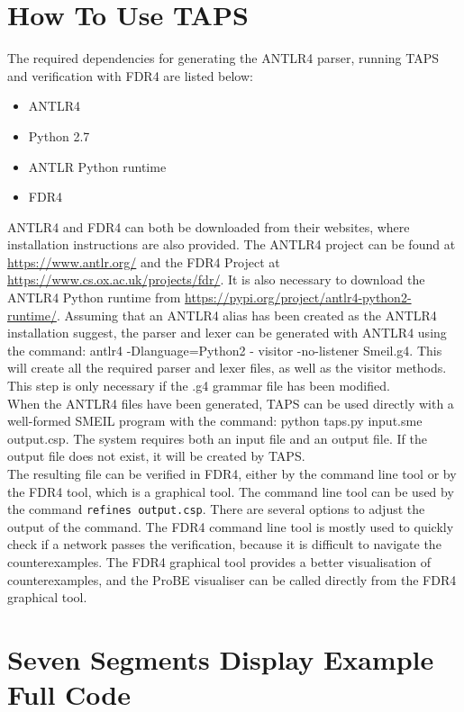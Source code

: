 \chapter{How To Use TAPS}
The required dependencies for generating the ANTLR4 parser, running TAPS and verification with FDR4 are listed below:
\begin{itemize}
    \item ANTLR4
    \item Python 2.7
    \item ANTLR Python runtime
    \item FDR4
\end{itemize}

ANTLR4 and FDR4 can both be downloaded from their websites, where installation instructions are also provided.
The ANTLR4 project can be found at \url{https://www.antlr.org/} and the FDR4 Project at \url{https://www.cs.ox.ac.uk/projects/fdr/}.
It is also necessary to download the ANTLR4 Python runtime from \url{https://pypi.org/project/antlr4-python2-runtime/}.
Assuming that an ANTLR4 alias has been created as the ANTLR4 installation suggest, the parser and lexer can be generated with ANTLR4 using the command: {\ttfamily antlr4 -Dlanguage=Python2 - visitor -no-listener Smeil.g4.}
This will create all the required parser and lexer files, as well as the visitor methods. This step is only necessary if the .g4 grammar file has been modified.\\

When the ANTLR4 files have been generated, TAPS can be used directly with a well-formed SMEIL program with the command: {\ttfamily python taps.py input.sme output.csp}. The system requires both an input file and an output file. If the output file does not exist, it will be created by TAPS. \\

The resulting \cspm{} file can be verified in FDR4, either by the command line tool or by the FDR4 tool, which is a graphical tool. The command line tool can be used by the command \texttt{refines output.csp}. There are several options to adjust the output of the command. The FDR4 command line tool is mostly used to quickly check if a network passes the verification, because it is difficult to navigate the counterexamples. The FDR4 graphical tool provides a better visualisation of counterexamples, and the ProBE visualiser can be called directly from the FDR4 graphical tool.

\chapter{Seven Segments Display Example Full Code}
\label{app:seven_segments}
